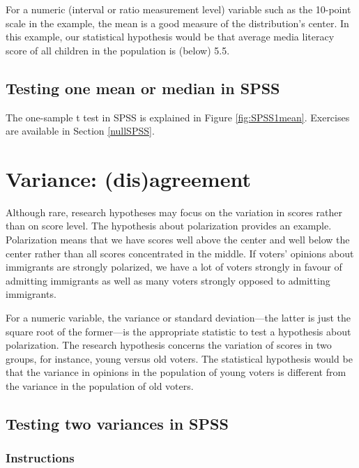 \documentclass[a4paper]{book}
\theoremstyle{definition}
\theoremstyle{definition}
\theoremstyle{definition}
\theoremstyle{remark}
\begin{document}
For a numeric (interval or ratio measurement level) variable such as the
10-point scale in the example, the mean is a good measure of the
distribution's center. In this example, our statistical hypothesis would
be that average media literacy score of all children in the population
is (below) 5.5.

\subsection*{Testing one mean or median in
SPSS}\label{testing-one-mean-or-median-in-spss}

The one-sample t test in SPSS is explained in Figure
\ref{fig:SPSS1mean}. Exercises are available in Section \ref{nullSPSS}.

\section*{Variance: (dis)agreement}\label{variance-disagreement}

Although rare, research hypotheses may focus on the variation in scores
rather than on score level. The hypothesis about polarization provides
an example. Polarization means that we have scores well above the center
and well below the center rather than all scores concentrated in the
middle. If voters' opinions about immigrants are strongly polarized, we
have a lot of voters strongly in favour of admitting immigrants as well
as many voters strongly opposed to admitting immigrants.

For a numeric variable, the variance or standard deviation---the latter
is just the square root of the former---is the appropriate statistic to
test a hypothesis about polarization. The research hypothesis concerns
the variation of scores in two groups, for instance, young versus old
voters. The statistical hypothesis would be that the variance in
opinions in the population of young voters is different from the
variance in the population of old voters.

\subsection*{Testing two variances in
SPSS}\label{testing-two-variances-in-spss}

\subsubsection*{Instructions}\label{instructions-11}
\end{document}
